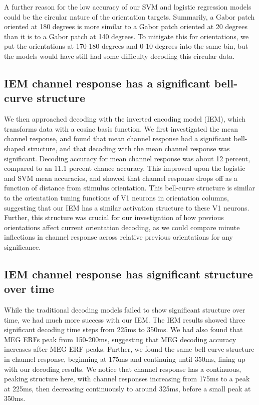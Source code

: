 \documentclass[../main.tex]{subfiles}
\begin{document}
A further reason for the low accuracy of our SVM and logistic regression models could be the circular nature of the orientation targets. Summarily, a Gabor patch oriented at 180 degrees is more similar to a Gabor patch oriented at 20 degrees than it is to a Gabor patch at 140 degrees. To mitigate this for orientations, we put the orientations at 170-180 degrees and 0-10 degrees into the same bin, but the models would have still had some difficulty decoding this circular data.


\subsection{IEM channel response has a significant bell-curve structure}
We then approached decoding with the inverted encoding model (IEM), which transforms data with a cosine basis function. We first investigated the mean channel response, and found that mean channel response had a significant bell-shaped structure, and that decoding with the mean channel response was significant. Decoding accuracy for mean channel response was about 12 percent, compared to an 11.1 percent chance accuracy. This improved upon the logistic and SVM mean accuracies, and showed that channel response drops off as a function of distance from stimulus orientation. This bell-curve structure is similar to the orientation tuning functions of V1 neurons in orientation columns, suggesting that our IEM has a similar activation structure to these V1 neurons. Further, this structure was crucial for our investigation of how previous orientations affect current orientation decoding, as we could compare minute inflections in channel response across relative previous orientations for any significance.  

\subsection{IEM channel response has significant structure over time}
While the traditional decoding models failed to show significant structure over time, we had much more success with our IEM. The IEM results showed three significant decoding time steps from 225ms to 350ms. We had also found that MEG ERFs peak from 150-200ms, suggesting that MEG decoding accuracy increases after MEG ERF peaks. Further, we found the same bell curve structure in channel response, beginning at 175ms and continuing until 350ms, lining up with our decoding results. We notice that channel response has a continuous, peaking structure here, with channel responses increasing from 175ms to a peak at 225ms, then decreasing continuously to around 325ms, before a small peak at 350ms. 
\end{document}
